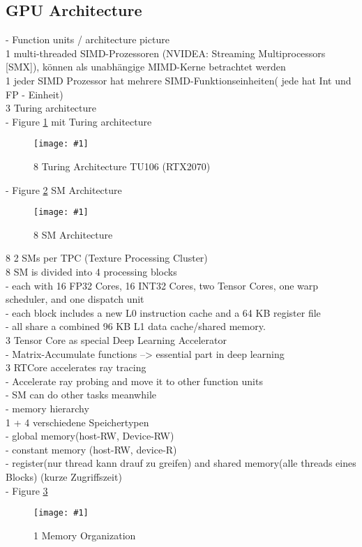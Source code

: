 \documentclass[a4paper,12pt]{llncs}
\numberwithin{equation}{section}
\newcommand{\bild}[4]{
  \begin{figure}[htbp]
    \begin{center}
      \texttt{[image: \#1]}
      \caption[#4]{#3}
      \label{#2}
    \end{center}
  \end{figure}
}
\newcommand{\bildbreite}[5]{
  \begin{figure}[htbp]
    \begin{center}
      \texttt{[image: \#1]}
      \caption[#5]{#4}
      \label{#3}
    \end{center}
  \end{figure}
}
\begin{document}
\subsection{GPU Architecture}
    - Function units / architecture picture\\
      1 multi-threaded SIMD-Prozessoren (NVIDEA: Streaming Multiprocessors [SMX]), können als unabhängige MIMD-Kerne betrachtet werden\\
      1 jeder SIMD Prozessor hat mehrere SIMD-Funktionseinheiten( jede hat Int und FP - Einheit)\\
	  3 Turing architecture\\
	  - Figure \ref{fig:turingOverall} mit Turing architecture\\
	  \bildbreite{figures/Turing_architecture.JPG}{6cm}{fig:turingOverall}{8 Turing Architecture TU106 (RTX2070)}{}
	  - Figure \ref{fig:smArch} SM Architecture\\
	  \bildbreite{figures/SM_arch.jpg}{4cm}{fig:smArch}{8 SM Architecture}{}
	  8 2 SMs per TPC (Texture Processing Cluster)\\
	  8 SM is divided into 4 processing blocks\\
	    - each with 16 FP32 Cores, 16 INT32 Cores, two Tensor Cores, one warp scheduler, and one dispatch unit\\
	    - each block includes a new L0 instruction cache and a 64 KB register file\\
	    - all share a combined 96 KB L1 data cache/shared memory.\\

	  3 Tensor Core as special Deep Learning Accelerator\\
	    - Matrix-Accumulate functions --> essential part in deep learning\\
	  3 RTCore accelerates ray tracing\\
	    - Accelerate ray probing and move it to other function units\\
	    - SM can do other tasks meanwhile\\
	  
	  
    - memory hierarchy\\
      1 + 4 verschiedene Speichertypen\\
        - global memory(host-RW, Device-RW)\\
        - constant memory (host-RW, device-R)\\
        - register(nur thread kann drauf zu greifen) and shared memory(alle threads eines Blocks) (kurze Zugriffszeit)\\
        - Figure \ref{fig:memorga}
    \bild{figures/speicheroragnisation.jpg}{fig:memorga}{1 Memory Organization}{}
        
\end{document}
